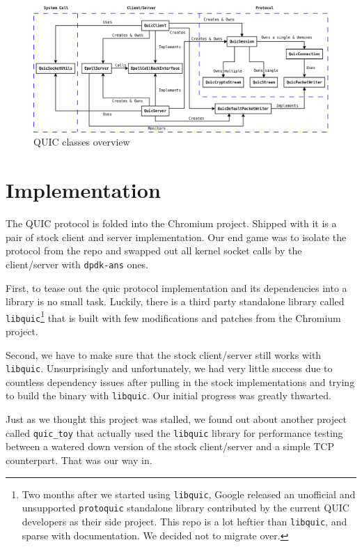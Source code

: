 \documentclass{sig-alternate-05-2015}
\begin{document}
\begin{figure}
\centering
\includegraphics[scale=0.28]{class.png}
\caption{QUIC classes overview}
\end{figure}

\section{Implementation}
The QUIC protocol is folded into the Chromium project. Shipped with it is a pair of stock client and server implementation. Our end game was to isolate the protocol from the repo and swapped out all kernel socket calls by the client/server with \texttt{dpdk-ans} ones. 
 
First, to tease out the quic protocol implementation and its dependencies into a library is no small task. Luckily, there is a third party standalone library called \texttt{libquic}\footnote{Two months after we started using \texttt{libquic}, Google released an unofficial and unsupported \texttt{protoquic} standalone library contributed by the current QUIC developers as their side project. This repo is a lot heftier than \texttt{libquic}, and sparse with documentation. We decided not to migrate over.} that is built with few modifications and patches from the Chromium project. 

Second, we have to make sure that the stock client/server still works with \texttt{libquic}. Unsurprisingly and unfortunately, we had very little success due to countless dependency issues after pulling in the stock implementations and trying to build the binary with \texttt{libquic}. Our initial progress was greatly thwarted. 

Just as we thought this project was stalled, we found out about another project called \texttt{quic\_toy} that actually used the \texttt{libquic} library for performance testing between a watered down version of the stock client/server and a simple TCP counterpart. That was our way in. 
\end{document}

